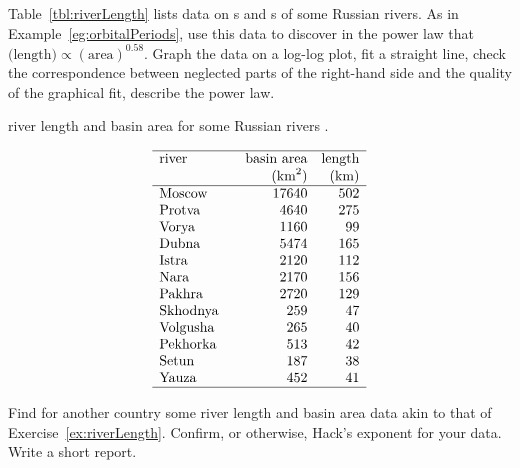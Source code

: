 \begin{exercise} \label{ex:riverLength} 
Table~\ref{tbl:riverLength} lists data on s and s of some Russian rivers. 
As in Example~\ref{eg:orbitalPeriods}, use this data to discover  in the power law that \(\text{(length)}\propto(\text{area})^{0.58}\).  
Graph the data on a log-log plot, fit a straight line, check the correspondence between neglected parts of the right-hand side and the quality of the graphical fit, describe the power law.
\setbox\ajrqrbox\hbox{}%
\marginpar{\usebox{\ajrqrbox\\[2ex]}}%
\begin{table}
\caption{river length and basin area for some Russian rivers \cite[p.154]{Arnold2014}.}
\label{tbl:riverLength}
\begin{equation*}
\begin{array}{p{12ex}rr} \hline
river&\text{basin area}&\text{length}\\
&(\text{km}^2)&\text{(km)}\\\hline
Moscow& 17640 & 502 \\
Protva& 4640 & 275 \\
Vorya& 1160 & 99 \\
Dubna& 5474 & 165 \\
Istra& 2120 & 112 \\
Nara& 2170 & 156 \\
Pakhra& 2720 & 129 \\
Skhodnya& 259 & 47 \\
Volgusha& 265 & 40 \\
Pekhorka& 513 & 42 \\
Setun& 187 & 38 \\
Yauza& 452 & 41 \\
\hline
\end{array}
\end{equation*}
\end{table}%
\end{exercise}

\begin{exercise} \label{ex:riverLength2} 
Find for another country some river length and basin area data akin to that of Exercise~\ref{ex:riverLength}.
Confirm, or otherwise, Hack's exponent for your data.  
Write a short report.
\end{exercise}


